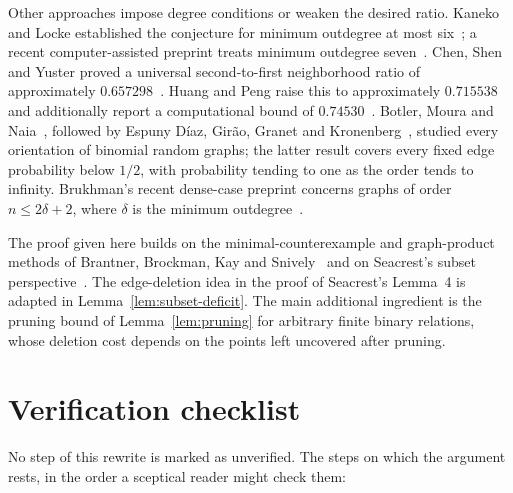 \documentclass[11pt]{article}
\theoremstyle{remark}
\begin{document}
Other approaches impose degree conditions or weaken the desired ratio.
Kaneko and Locke established the conjecture for minimum outdegree at most
six~\cite{KanekoLocke2001}; a recent computer-assisted preprint treats
minimum outdegree seven~\cite{SadhukhanSandeepSen2026}.
Chen, Shen and Yuster proved a universal second-to-first neighborhood
ratio of approximately $0.657298$~\cite{ChenShenYuster2003}.
Huang and Peng raise this to approximately $0.715538$ and additionally
report a computational bound of $0.74530$~\cite{HuangPeng2024}.
Botler, Moura and Naia~\cite{BotlerMouraNaia2023}, followed by
Espuny D\'iaz, Gir\~ao, Granet and Kronenberg~\cite{EspunyDiazEtAl2025},
studied every orientation of binomial random graphs; the latter result
covers every fixed edge probability below $1/2$, with probability tending
to one as the order tends to infinity. Brukhman's recent dense-case
preprint concerns graphs of order $n\leq 2\delta+2$, where $\delta$ is
the minimum outdegree~\cite{Brukhman2026}.

The proof given here builds on the minimal-counterexample and graph-product
methods of Brantner, Brockman, Kay and
Snively~\cite{BrantnerBrockmanKaySnively2009} and on Seacrest's
subset perspective~\cite{Seacrest2019}. The edge-deletion idea in the proof
of Seacrest's Lemma~4 is adapted in Lemma~\ref{lem:subset-deficit}. The main
additional ingredient is the pruning bound of Lemma~\ref{lem:pruning} for
arbitrary finite binary relations, whose deletion cost depends on the points
left uncovered after pruning.

\section{Verification checklist}\label{sec:checklist}

No step of this rewrite is marked as unverified. The steps on which the
argument rests, in the order a sceptical reader might check them:
\end{document}
